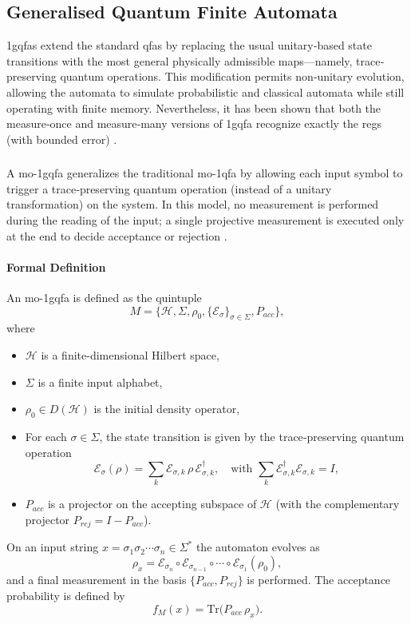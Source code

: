 \subsection{Generalised Quantum Finite Automata}
\label{sec:generalised-qfa}
\glspl{1gqfa} extend the standard \glspl{qfa} by replacing the usual unitary‐based state transitions with the most general physically admissible maps—namely, trace‐preserving quantum operations. This modification permits non‐unitary evolution, allowing the automata to simulate probabilistic and classical automata while still operating with finite memory. Nevertheless, it has been shown that both the measure‐once and measure‐many versions of \gls{1gqfa} recognize exactly the \glspl{reg} (with bounded error) \cite{li2012characterizations}.

\subsubsection{}
A \gls{mo-1gqfa} generalizes the traditional \gls{mo-1qfa} by allowing each input symbol to trigger a trace‐preserving quantum operation (instead of a unitary transformation) on the system. In this model, no measurement is performed during the reading of the input; a single projective measurement is executed only at the end to decide acceptance or rejection \cite{li2012characterizations}.

\paragraph{Formal Definition}
An \gls{mo-1gqfa} is defined as the quintuple
\[
M = \{ \mathcal{H},\Sigma,\rho_0,\{\mathcal{E}_\sigma\}_{\sigma\in\Sigma},P_{acc}\},
\]
where
\begin{itemize}
  \item $\mathcal{H}$ is a finite-dimensional Hilbert space,
  \item $\Sigma$ is a finite input alphabet,
  \item $\rho_0\in D(\mathcal{H})$ is the initial density operator,
  \item For each $\sigma\in\Sigma$, the state transition is given by the trace‐preserving quantum operation 
  \[
  \mathcal{E}_\sigma(\rho)=\sum_{k} \mathcal{E}_{\sigma,k}\,\rho\,\mathcal{E}_{\sigma,k}^\dagger,\quad \text{with } \sum_{k} \mathcal{E}_{\sigma,k}^\dagger \mathcal{E}_{\sigma,k}=I,
  \]
  \item $P_{acc}$ is a projector on the accepting subspace of $\mathcal{H}$ (with the complementary projector $P_{rej}=I-P_{acc}$).
\end{itemize}
On an input string $x=\sigma_1\sigma_2\cdots\sigma_n\in\Sigma^*$ the automaton evolves as
\[
\rho_x = \mathcal{E}_{\sigma_n}\circ \mathcal{E}_{\sigma_{n-1}}\circ\cdots\circ \mathcal{E}_{\sigma_1}(\rho_0),
\]
and a final measurement in the basis $\{P_{acc},P_{rej}\}$ is performed. The acceptance probability is defined by
\[
f_M(x)=\mathrm{Tr}\bigl(P_{acc}\,\rho_x\bigr).
\]

